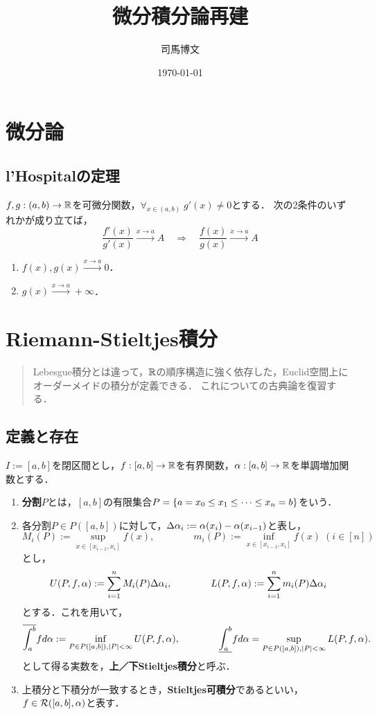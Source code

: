 \documentclass[uplatex, dvipdfmx]{jsreport}
\title{微分積分論再建}
\author{司馬博文}
\date{\today}
\begin{document}
\tableofcontents

\chapter{微分論}

\section{l'Hospitalの定理}

\begin{theorem}
    $f,g:(a,b)\to\mathbb{R}$を可微分関数，$\forall_{x\in(a,b)}\;g'(x)\ne0$とする．
    次の2条件のいずれかが成り立てば，
    \[\frac{f'(x)}{g'(x)}\xrightarrow{x\to a}A\quad\Rightarrow\quad\frac{f(x)}{g(x)}\xrightarrow{x\to a}A\]
    \begin{enumerate}
        \item $f(x),g(x)\xrightarrow{x\to a}0$．
        \item $g(x)\xrightarrow{x\to a}+\infty$．
    \end{enumerate}
\end{theorem}

\chapter{Riemann-Stieltjes積分}

\begin{quotation}
    Lebesgue積分とは違って，$\mathbb{R}$の順序構造に強く依存した，Euclid空間上にオーダーメイドの積分が定義できる．
    これについての古典論を復習する．
\end{quotation}

\section{定義と存在}

\begin{definition}
    $I:=[a,b]$を閉区間とし，$f:[a,b]\to\mathbb{R}$を有界関数，$\alpha:[a,b]\to\mathbb{R}$を単調増加関数とする．
    \begin{enumerate}
        \item \textbf{分割}$P$とは，$[a,b]$の有限集合$P=\left\{a=x_0\le x_1\le\cdots\le x_n=b\right\}$をいう．
        \item 各分割$P\in P([a,b])$に対して，$\Delta\alpha_i:=\alpha(x_i)-\alpha(x_{i-1})$と表し，
        \[M_i(P):=\sup_{x\in[x_{i-1},x_i]}f(x),\qquad\qquad m_i(P):=\inf_{x\in[x_{i-1},x_i]}f(x)\;(i\in[n])\]
        とし，
        \[U(P,f,\alpha):=\sum^n_{i=1}M_i(P)\Delta\alpha_i,\qquad\qquad L(P,f,\alpha):=\sum^n_{i=1}m_i(P)\Delta\alpha_i\]
        とする．これを用いて，
        \[\overline{\int^b_a}fd\alpha:=\inf_{P\in P([a,b]),\lvert P\rvert<\infty}U(P,f,\alpha),\qquad\qquad\underline{\int^b_a}fd\alpha=\sup_{P\in P([a,b]),\lvert P\rvert<\infty}L(P,f,\alpha).\]
        として得る実数を，\textbf{上／下Stieltjes積分}と呼ぶ．
        \item 上積分と下積分が一致するとき，\textbf{Stieltjes可積分}であるといい，$f\in\mathcal{R}([a,b],\alpha)$と表す．
    \end{enumerate}
\end{definition}
\end{document}
